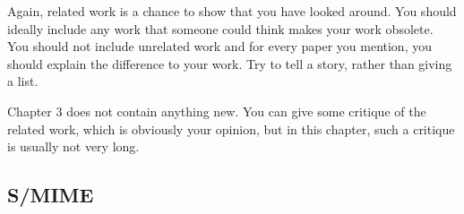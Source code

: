 Again, related work is a chance to show that you have looked
around. You should ideally include any work that someone could
think makes your work obsolete. You should not include unrelated
work and for every paper you mention, you should explain the
difference to your work. Try to tell a story, rather than giving a
list.

Chapter 3 does not contain anything new. You can give some critique
of the related work, which is obviously your opinion, but in this
chapter, such a critique is usually not very long.

\subsection{S/MIME}